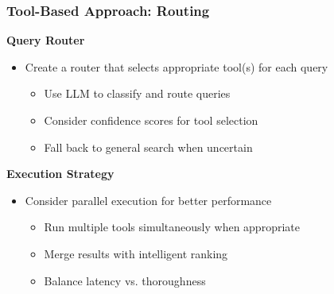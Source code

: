 \begin{frame}
    \frametitle{Tool-Based Approach: Routing}
    \textbf{Query Router}
    \begin{itemize}
        \item Create a router that selects appropriate tool(s) for each query
        \begin{itemize}
            \item Use LLM to classify and route queries
            \item Consider confidence scores for tool selection
            \item Fall back to general search when uncertain
        \end{itemize}
    \end{itemize}
    
    \vspace{0.3cm}
    \textbf{Execution Strategy}
    \begin{itemize}
        \item Consider parallel execution for better performance
        \begin{itemize}
            \item Run multiple tools simultaneously when appropriate
            \item Merge results with intelligent ranking
            \item Balance latency vs. thoroughness
        \end{itemize}
    \end{itemize}
\end{frame}

